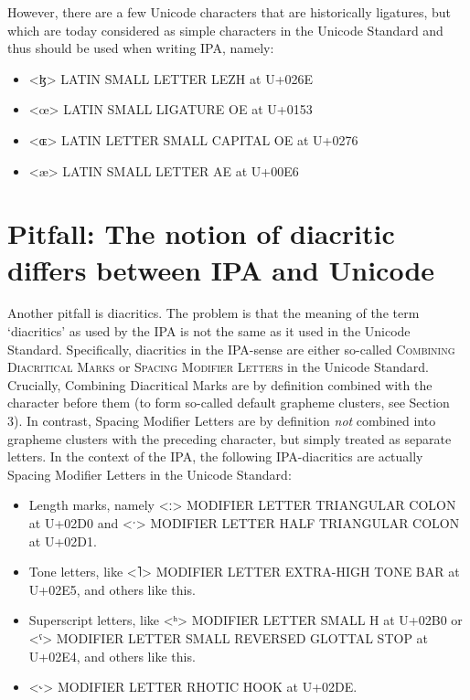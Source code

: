 However, there are a few Unicode characters that are historically ligatures, but which are today considered as simple characters in the Unicode Standard and thus should be used when writing IPA, namely:
\begin{itemize}
	\item <ɮ> LATIN SMALL LETTER LEZH at U+026E 
	\item <œ> LATIN SMALL LIGATURE OE at U+0153 
	\item <ɶ> LATIN LETTER SMALL CAPITAL OE at U+0276 
	\item <æ> LATIN SMALL LETTER AE at U+00E6 
\end{itemize}

\section{Pitfall: The notion of diacritic differs between IPA and Unicode}
\label{pitfall-the-ipa-notion-of-diacritics-is-not-the-same-as-the-unicode-standards-notion-of-diacritics}

Another pitfall is diacritics. The problem is that the meaning of the term `diacritics' as used by the IPA is not the same as it used in the Unicode Standard. Specifically, diacritics in the IPA-sense are either so-called \textsc{Combining Diacritical Marks} or \textsc{Spacing Modifier Letters} in the Unicode Standard. Crucially, Combining Diacritical Marks are by definition combined with the character before them (to form so-called default grapheme clusters, see Section 3). In contrast, Spacing Modifier Letters are by definition \emph{not} combined into grapheme clusters with the preceding character, but simply treated as separate letters. In the context of the IPA, the following IPA-diacritics are actually Spacing Modifier Letters in the Unicode Standard:
\begin{itemize}
	\item Length marks, namely <ː> MODIFIER LETTER TRIANGULAR COLON at U+02D0 and <ˑ> MODIFIER LETTER HALF TRIANGULAR COLON at U+02D1. 
	\item Tone letters, like <˥> MODIFIER LETTER EXTRA-HIGH TONE BAR at U+02E5, and others like this. 
	\item Superscript letters, like <ʰ> MODIFIER LETTER SMALL H at U+02B0 or <ˤ> MODIFIER LETTER SMALL REVERSED GLOTTAL STOP at U+02E4, and others like this. 
	\item <˞> MODIFIER LETTER RHOTIC HOOK at U+02DE. 
\end{itemize}

